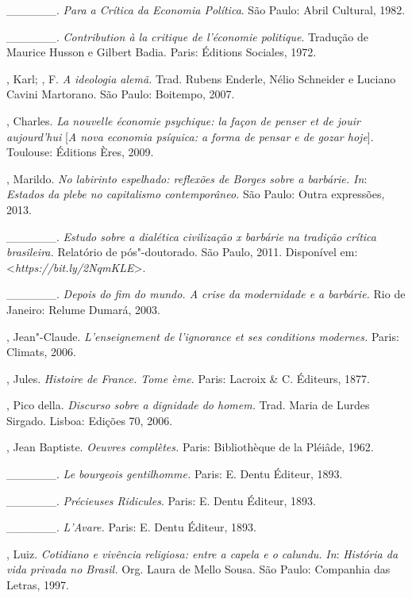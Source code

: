 \begin{Parskip}
\_\_\_\_\_\_. \emph{Para a Crítica da Economia Política}. São Paulo:
Abril Cultural, 1982.

\_\_\_\_\_\_. \emph{Contribution à la critique de l'économie
politique}. Tradução de Maurice Husson e Gilbert Badia. Paris: Éditions
Sociales, 1972.

, Karl; , F. \emph{A ideologia alemã.} Trad. Rubens Enderle,
Nélio Schneider e Luciano Cavini Martorano. São Paulo: Boitempo, 2007.

, Charles. \emph{La nouvelle économie psychique: la façon de
penser et de jouir aujourd'hui} [\emph{A nova economia psíquica: a
forma de pensar e de gozar hoje}]. Toulouse: Éditions Ères, 2009.

, Marildo. \emph{No labirinto espelhado: reflexões de Borges
sobre a barbárie. In}: \emph{Estados da plebe no capitalismo
contemporâneo.} São Paulo: Outra expressões, 2013.

\_\_\_\_\_\_. \emph{Estudo sobre a dialética civilização x barbárie na
tradição crítica brasileira.} Relatório de pós"-doutorado. São Paulo,
2011. Disponível em: \textless{}\emph{https://bit.ly/2NqmKLE}\textgreater{}.

\_\_\_\_\_\_. \emph{Depois do fim do mundo. A crise da modernidade e a
barbárie.} Rio de Janeiro: Relume Dumará, 2003.

, Jean"-Claude. \emph{L'enseignement de l'ignorance et ses
conditions modernes.} Paris: Climats, 2006.

, Jules. \emph{Histoire de France. Tome ème.} Paris: Lacroix
\& C. Éditeurs, 1877.

, Pico della. \emph{Discurso sobre a dignidade do homem.}
Trad. Maria de Lurdes Sirgado. Lisboa: Edições 70, 2006.

, Jean Baptiste. \emph{Oeuvres complètes.} Paris: Bibliothèque
de la Pléiâde, 1962.

\_\_\_\_\_\_. \emph{Le bourgeois gentilhomme.} Paris: E. Dentu
Éditeur, 1893.

\_\_\_\_\_\_. \emph{Précieuses Ridicules}. Paris: E. Dentu Éditeur,
1893.

\_\_\_\_\_\_. \emph{L'Avare.} Paris: E. Dentu Éditeur, 1893.

, Luiz. \emph{Cotidiano e vivência religiosa: entre a capela e o
calundu.} \emph{In}: \emph{História da vida privada no Brasil.} Org.
Laura de Mello Sousa. São Paulo: Companhia das Letras, 1997.


\end{Parskip}
